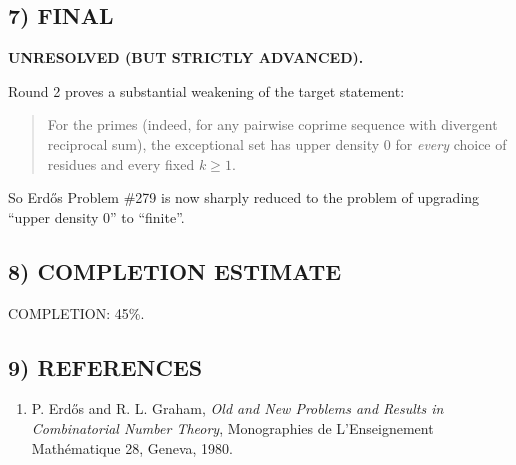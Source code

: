 \subsection*{7) FINAL}

\textbf{UNRESOLVED (BUT STRICTLY ADVANCED).}

Round 2 proves a substantial weakening of the target statement:

\begin{quote}
For the primes (indeed, for any pairwise coprime sequence with divergent reciprocal sum), the exceptional set has upper density $0$ for \emph{every} choice of residues and every fixed $k\ge 1$.
\end{quote}

So Erd\H{o}s Problem \#279 is now sharply reduced to the problem of upgrading ``upper density $0$'' to ``finite''.

\subsection*{8) COMPLETION ESTIMATE}

COMPLETION: 45\%.

\subsection*{9) REFERENCES}

\begin{enumerate}
\item P. Erd\H{o}s and R. L. Graham, \emph{Old and New Problems and Results in Combinatorial Number Theory}, Monographies de L'Enseignement Math\'ematique 28, Geneva, 1980.
\end{enumerate}


